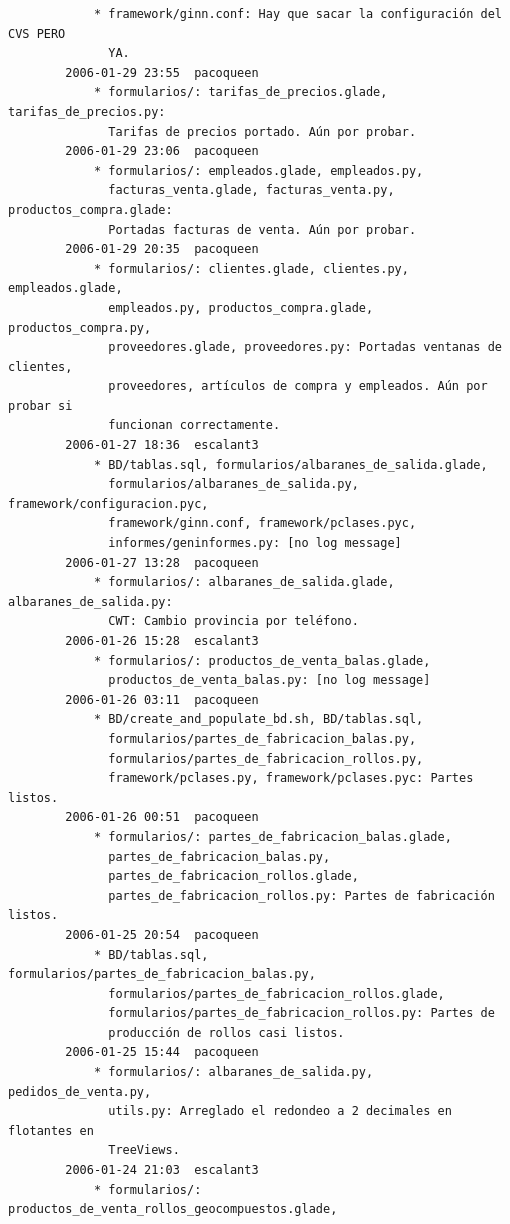 \documentclass[a4paper]{article}
\begin{document}
\begin{verbatim}
            * framework/ginn.conf: Hay que sacar la configuración del CVS PERO
              YA.
        2006-01-29 23:55  pacoqueen
            * formularios/: tarifas_de_precios.glade, tarifas_de_precios.py:
              Tarifas de precios portado. Aún por probar.
        2006-01-29 23:06  pacoqueen
            * formularios/: empleados.glade, empleados.py,
              facturas_venta.glade, facturas_venta.py, productos_compra.glade:
              Portadas facturas de venta. Aún por probar.
        2006-01-29 20:35  pacoqueen
            * formularios/: clientes.glade, clientes.py, empleados.glade,
              empleados.py, productos_compra.glade, productos_compra.py,
              proveedores.glade, proveedores.py: Portadas ventanas de clientes,
              proveedores, artículos de compra y empleados. Aún por probar si
              funcionan correctamente.
        2006-01-27 18:36  escalant3
            * BD/tablas.sql, formularios/albaranes_de_salida.glade,
              formularios/albaranes_de_salida.py, framework/configuracion.pyc,
              framework/ginn.conf, framework/pclases.pyc,
              informes/geninformes.py: [no log message]
        2006-01-27 13:28  pacoqueen
            * formularios/: albaranes_de_salida.glade, albaranes_de_salida.py:
              CWT: Cambio provincia por teléfono.
        2006-01-26 15:28  escalant3
            * formularios/: productos_de_venta_balas.glade,
              productos_de_venta_balas.py: [no log message]
        2006-01-26 03:11  pacoqueen
            * BD/create_and_populate_bd.sh, BD/tablas.sql,
              formularios/partes_de_fabricacion_balas.py,
              formularios/partes_de_fabricacion_rollos.py,
              framework/pclases.py, framework/pclases.pyc: Partes listos.
        2006-01-26 00:51  pacoqueen
            * formularios/: partes_de_fabricacion_balas.glade,
              partes_de_fabricacion_balas.py,
              partes_de_fabricacion_rollos.glade,
              partes_de_fabricacion_rollos.py: Partes de fabricación listos.
        2006-01-25 20:54  pacoqueen
            * BD/tablas.sql, formularios/partes_de_fabricacion_balas.py,
              formularios/partes_de_fabricacion_rollos.glade,
              formularios/partes_de_fabricacion_rollos.py: Partes de
              producción de rollos casi listos.
        2006-01-25 15:44  pacoqueen
            * formularios/: albaranes_de_salida.py, pedidos_de_venta.py,
              utils.py: Arreglado el redondeo a 2 decimales en flotantes en
              TreeViews.
        2006-01-24 21:03  escalant3
            * formularios/: productos_de_venta_rollos_geocompuestos.glade,

\end{verbatim}
\end{document}
